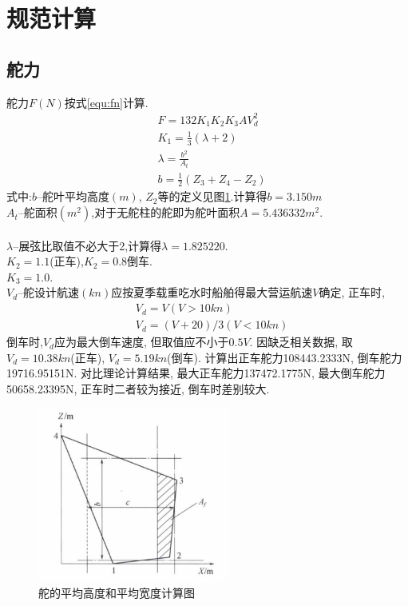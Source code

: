 \documentclass[a4paper,UTF8]{article}
\begin{document}
\section{规范计算}
\subsection{舵力}
舵力$F(N)$按式\ref{equ:fn}计算.
\begin{equation}\label{equ:fn}
\begin{split}
&F=132K_{1}K_{2}K_{3}AV_{d}^2\\
&K_{1}=\frac{1}{3}(\lambda+2)\\
&\lambda=\frac{b^2}{A_{t}}\\
&b=\frac{1}{2}(Z_{3}+Z_{4}-Z_{2})
\end{split}
\end{equation}
式中:$b$--舵叶平均高度$(m)$, $Z_{2}$等的定义见图\ref{fig:aver}.计算得$b=3.150m$\\
$A_{t}$--舵面积$(m^2)$,对于无舵柱的舵即为舵叶面积$A=5.436332m^{2}$.\\
\\$\lambda$--展弦比取值不必大于2,计算得$\lambda=1.825220$. \\$K_{2}=1.1$(正车),$K_{2}=0.8$倒车. \\$K_{3}=1.0$. \\$V_{d}$--舵设计航速$(kn)$应按夏季载重吃水时船舶得最大营运航速$V$确定, 正车时,
\begin{equation}
\begin{split}
&V_{d}=V	(V>10kn)\\
&V_{d}=(V+20)/3 (V<10kn)
\end{split}
\end{equation}
倒车时,$V_{d}$应为最大倒车速度, 但取值应不小于$0.5V$. 因缺乏相关数据, 取$V_{d}=10.38kn$(正车), $V_{d}=5.19kn$(倒车).
计算出正车舵力108443.2333N, 倒车舵力19716.95151N.
对比理论计算结果, 最大正车舵力137472.1775N, 最大倒车舵力50658.23395N, 正车时二者较为接近, 倒车时差别较大.
\begin{figure}
	\centering
	\includegraphics[width=2.5in]{figure/average}
	\caption{舵的平均高度和平均宽度计算图}
	\label{fig:aver}
\end{figure}
\end{document}
